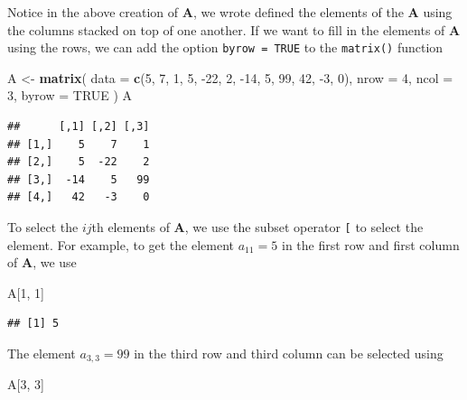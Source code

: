 \documentclass[
]{book}
\newenvironment{Shaded}{\begin{snugshade}}{\end{snugshade}}
\newcommand{\DataTypeTok}[1]{\textcolor[rgb]{0.13,0.29,0.53}{#1}}
\newcommand{\DecValTok}[1]{\textcolor[rgb]{0.00,0.00,0.81}{#1}}
\newcommand{\KeywordTok}[1]{\textcolor[rgb]{0.13,0.29,0.53}{\textbf{#1}}}
\newcommand{\NormalTok}[1]{#1}
\newcommand{\OtherTok}[1]{\textcolor[rgb]{0.56,0.35,0.01}{#1}}
\newcommand{\StringTok}[1]{\textcolor[rgb]{0.31,0.60,0.02}{#1}}
\theoremstyle{definition}
\theoremstyle{definition}
\theoremstyle{definition}
\theoremstyle{remark}
\begin{document}
Notice in the above creation of \(\mathbf{A}\), we wrote defined the elements of the \(\mathbf{A}\) using the columns stacked on top of one another. If we want to fill in the elements of \(\mathbf{A}\) using the rows, we can add the option \texttt{byrow\ =\ TRUE} to the \texttt{matrix()} function

\begin{Shaded}
\begin{Highlighting}[]
\NormalTok{A <-}\StringTok{ }\KeywordTok{matrix}\NormalTok{(}
    \DataTypeTok{data  =} \KeywordTok{c}\NormalTok{(}\DecValTok{5}\NormalTok{, }\DecValTok{7}\NormalTok{, }\DecValTok{1}\NormalTok{, }\DecValTok{5}\NormalTok{, }\DecValTok{-22}\NormalTok{, }\DecValTok{2}\NormalTok{, }\DecValTok{-14}\NormalTok{, }\DecValTok{5}\NormalTok{, }\DecValTok{99}\NormalTok{, }\DecValTok{42}\NormalTok{, }\DecValTok{-3}\NormalTok{, }\DecValTok{0}\NormalTok{), }
    \DataTypeTok{nrow  =} \DecValTok{4}\NormalTok{,}
    \DataTypeTok{ncol  =} \DecValTok{3}\NormalTok{,}
    \DataTypeTok{byrow =} \OtherTok{TRUE}
\NormalTok{)}
\NormalTok{A}
\end{Highlighting}
\end{Shaded}

\begin{verbatim}
##      [,1] [,2] [,3]
## [1,]    5    7    1
## [2,]    5  -22    2
## [3,]  -14    5   99
## [4,]   42   -3    0
\end{verbatim}

To select the \(ij\)th elements of \(\mathbf{A}\), we use the subset operator \texttt{{[}} to select the element. For example, to get the element \(a_{11} = 5\) in the first row and first column of \(\mathbf{A}\), we use

\begin{Shaded}
\begin{Highlighting}[]
\NormalTok{A[}\DecValTok{1}\NormalTok{, }\DecValTok{1}\NormalTok{]}
\end{Highlighting}
\end{Shaded}

\begin{verbatim}
## [1] 5
\end{verbatim}

The element \(a_{3, 3} = 99\) in the third row and third column can be selected using

\begin{Shaded}
\begin{Highlighting}[]
\NormalTok{A[}\DecValTok{3}\NormalTok{, }\DecValTok{3}\NormalTok{]}
\end{Highlighting}
\end{Shaded}
\end{document}
